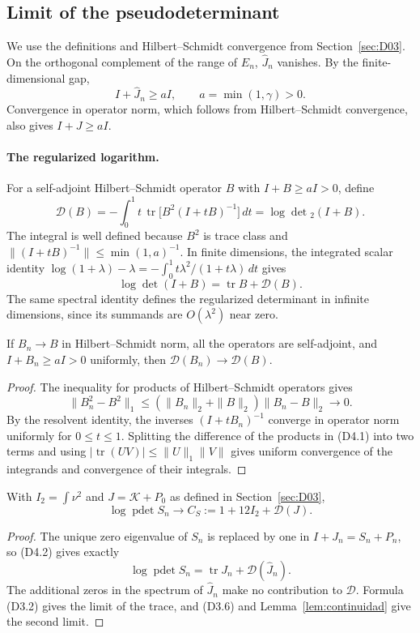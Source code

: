 \subsection{Limit of the pseudodeterminant}\label{sec:D04}
We use the definitions and Hilbert--Schmidt convergence from Section~\ref{sec:D03}.
On the orthogonal complement of the range of $E_n$, $\widehat J_n$ vanishes.
By the finite-dimensional gap,
\[
 I+\widehat J_n\ge aI,\qquad a=\min(1,\gamma)>0.
\]
Convergence in operator norm, which follows from
Hilbert--Schmidt convergence, also gives $I+J\ge aI$.

\paragraph{The regularized logarithm.}
For a self-adjoint Hilbert--Schmidt operator $B$ with $I+B\ge aI>0$, define
\[
 \mathcal D(B)=-\int_0^1 t\,
       \operatorname{tr}\bigl[B^2(I+tB)^{-1}\bigr]\,dt
             =\log\det{}_2(I+B).                    \tag{D4.1}
\]
The integral is well defined because $B^2$ is trace class and
$\|(I+tB)^{-1}\|\le\min(1,a)^{-1}$.
In finite dimensions, the integrated scalar identity
$\log(1+\lambda)-\lambda
=-\int_0^1 t\lambda^2/(1+t\lambda)\,dt$ gives
\[
 \log\det(I+B)=\operatorname{tr}B+\mathcal D(B).       \tag{D4.2}
\]
The same spectral identity defines the regularized determinant
in infinite dimensions, since its summands are $O(\lambda^2)$ near zero.

\begin{lema}\label{lem:continuidad}
If $B_n\to B$ in Hilbert--Schmidt norm, all the operators are self-adjoint, and
$I+B_n\ge aI>0$ uniformly, then
$\mathcal D(B_n)\to\mathcal D(B)$.
\end{lema}
\begin{proof}
The inequality for products of Hilbert--Schmidt operators gives
\[
 \|B_n^2-B^2\|_1\le
       (\|B_n\|_2+\|B\|_2)\|B_n-B\|_2\longrightarrow0.
\]
By the resolvent identity, the inverses $(I+tB_n)^{-1}$
converge in operator norm uniformly for $0\le t\le1$.
Splitting the difference of the products in (D4.1) into two terms
and using $|\operatorname{tr}(UV)|\le\|U\|_1\|V\|$
gives uniform convergence of the integrands and convergence of their integrals.
\end{proof}

\begin{teorema}\label{thm:pdet}
With $I_2=\int\nu^2$ and $J=\mathcal K+P_0$ as defined in Section~\ref{sec:D03},
\[
 \log\operatorname{pdet}S_n
 \longrightarrow C_S:=1+12I_2+\mathcal D(J).           \tag{D4.3}
\]
\end{teorema}
\begin{proof}
The unique zero eigenvalue of $S_n$ is replaced by one in
$I+J_n=S_n+P_n$, so (D4.2) gives exactly
\[
 \log\operatorname{pdet}S_n
       =\operatorname{tr}J_n+\mathcal D(\widehat J_n).
\]
The additional zeros in the spectrum of $\widehat J_n$ make no contribution to
$\mathcal D$. Formula (D3.2) gives the limit of the trace,
and (D3.6) and Lemma~\ref{lem:continuidad} give the second limit.
\end{proof}

